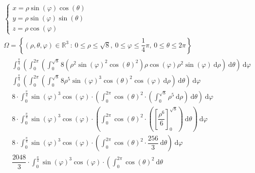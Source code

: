 \documentclass[a4paper]{article}
\begin{document}
	\begin{gather*}
		\begin{cases}
			x = \rho \sin\left(\varphi\right) \cos\left(\theta\right) \\
			y = \rho \sin\left(\varphi\right) \sin\left(\theta\right) \\
			z = \rho \cos\left(\varphi\right)
		\end{cases} \\
		\Omega = \left\{\left(\rho,\theta,\varphi\right) \in \mathbb{R}^{3} \: : \: 0 \le \rho \le \sqrt{8},\: 0 \le \varphi \le \dfrac{1}{4}\pi,\: 0 \le \theta \le 2\pi\right\} \\
		\begin{array}{ll}
			&\displaystyle\int_{0}^{\frac{\pi}{4}} \left(
				\int_{0}^{2\pi} \left(
					\int_{0}^{\sqrt{8}} 8\left(\rho^{2}\sin\left(\varphi\right)^{2}\cos\left(\theta\right)^{2}\right)\rho\cos\left(\varphi\right)\rho^{2}\sin\left(\varphi\right) \:\mathrm{d}\rho
				\right) \:\mathrm{d}\theta
			\right) \:\mathrm{d}\varphi \\ [1.5em]
			&\displaystyle\int_{0}^{\frac{\pi}{4}} \left(
				\int_{0}^{2\pi} \left(
					\int_{0}^{\sqrt{8}} 8 \rho^{5} \sin\left(\varphi\right)^{3} \cos\left(\theta\right)^{2} \cos\left(\varphi\right) \:\mathrm{d}\rho
				\right) \:\mathrm{d}\theta
			\right) \:\mathrm{d}\varphi \\ [1.5em]
			& 8 \cdot \displaystyle\int_{0}^{\frac{\pi}{4}} \sin\left(\varphi\right)^{3} \cos\left(\varphi\right) \cdot \left(
				\int_{0}^{2\pi} \cos\left(\theta\right)^{2} \cdot \left(
					\int_{0}^{\sqrt{8}} \rho^{5} \:\mathrm{d}\rho
				\right) \:\mathrm{d}\theta
			\right) \:\mathrm{d}\varphi \\ [1.5em]
			& 8 \cdot \displaystyle\int_{0}^{\frac{\pi}{4}} \sin\left(\varphi\right)^{3} \cos\left(\varphi\right) \cdot \left(
				\int_{0}^{2\pi} \cos\left(\theta\right)^{2} \cdot \left(
					\left[\dfrac{\rho^{6}}{6}\right]_{0}^{\sqrt{8}}
				\right) \:\mathrm{d}\theta
			\right) \:\mathrm{d}\varphi \\ [1.5em]
			& 8 \cdot \displaystyle\int_{0}^{\frac{\pi}{4}} \sin\left(\varphi\right)^{3} \cos\left(\varphi\right) \cdot \left(
				\int_{0}^{2\pi} \cos\left(\theta\right)^{2} \cdot \dfrac{256}{3} \:\mathrm{d}\theta
			\right) \:\mathrm{d}\varphi \\ [1.5em]
			& \dfrac{2048}{3} \cdot \displaystyle\int_{0}^{\frac{\pi}{4}} \sin\left(\varphi\right)^{3} \cos\left(\varphi\right) \cdot \left(
				\int_{0}^{2\pi} \cos\left(\theta\right)^{2} \:\mathrm{d}\theta

\end{array}
\end{gather*}
\end{document}
